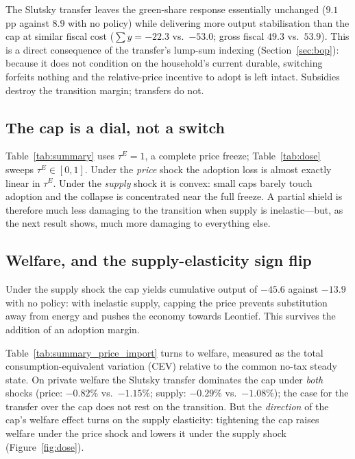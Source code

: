 \documentclass[11pt,a4paper]{article}
\begin{document}
The Slutsky transfer leaves the green-share response essentially unchanged
($9.1$ pp against $8.9$ with no policy) while delivering more output
stabilisation than the cap at similar fiscal cost ($\sum y=-22.3$ vs.\ $-53.0$;
gross fiscal $49.3$ vs.\ $53.9$). This is a direct consequence of the transfer's
lump-sum indexing (Section~\ref{sec:bop}): because it does not condition on the
household's current durable, switching forfeits nothing and the relative-price
incentive to adopt is left intact. Subsidies destroy the transition margin;
transfers do not.

\subsection{The cap is a dial, not a switch}
\label{sec:dial}

Table~\ref{tab:summary} uses $\tau^{E}=1$, a complete price freeze;
Table~\ref{tab:dose} sweeps $\tau^{E}\in[0,1]$. Under the \emph{price} shock the
adoption loss is almost exactly linear in $\tau^{E}$. Under the \emph{supply}
shock it is convex: small caps barely touch adoption and the collapse is
concentrated near the full freeze. A partial shield is therefore much less
damaging to the transition when supply is inelastic---but, as the next result
shows, much more damaging to everything else.



\subsection{Welfare, and the supply-elasticity sign flip}
\label{sec:welfare}

Under the supply shock the cap yields cumulative output of $-45.6$ against
$-13.9$ with no policy: with inelastic supply, capping the price prevents
substitution away from energy and pushes the economy towards Leontief. This
survives the addition of an adoption margin.



Table~\ref{tab:summary_price_import} turns to welfare, measured as the total
consumption-equivalent variation (CEV) relative to the common no-tax steady
state. On private welfare the Slutsky transfer dominates the cap under
\emph{both} shocks (price: $-0.82\%$ vs.\ $-1.15\%$; supply: $-0.29\%$ vs.\ $-1.08\%$); the case for the transfer over the cap
does not rest on the transition. But the \emph{direction} of the cap's welfare
effect turns on the supply elasticity: tightening the cap raises welfare under
the price shock and lowers it under the supply shock (Figure~\ref{fig:dose}).
\end{document}
